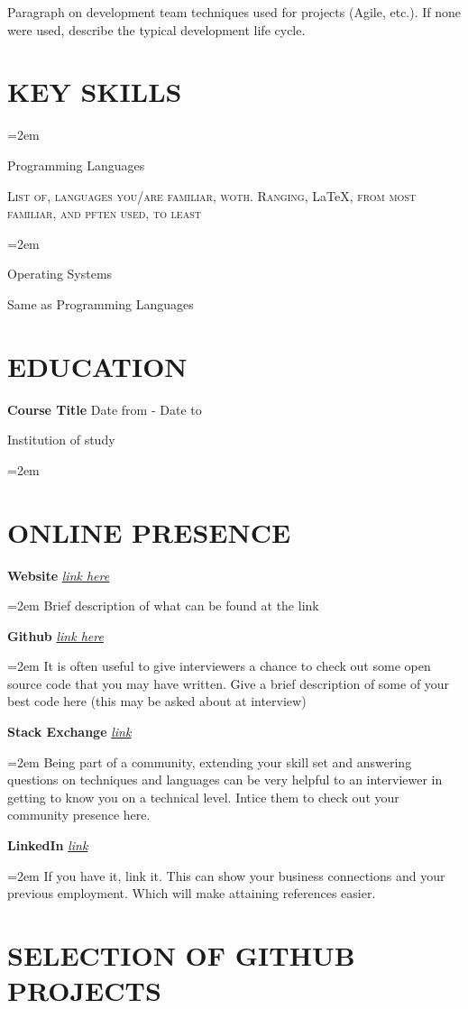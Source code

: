 \documentclass[paper=a4,fontsize=10pt]{scrartcl}	 		%
\newlength{\spacebox}
\newcommand{\sepspace}{\vspace*{1em}}				%
\newcommand{\NewPart}[1]{\section*{\uppercase{#1}}}
\newcommand{\PersonalEntry}[2]{
		\noindent\hangindent=2em\hangafter=0 		%
		\parbox{\spacebox}{					%
		\textit{#1}}							%
		\hspace{1.5em} #2 \par}					%
\newcommand{\SkillsEntry}[2]{						%
		\noindent\hangindent=2em\hangafter=0 		%
		\parbox{\spacebox}{					%
		{#1}}								%
		\hspace{1.5em} #2 \par}					%
\newcommand{\EducationEntry}[5]{
		\noindent \textbf{#1} \hfill				%
		#2 \par							%
		\noindent #3 						%
		\hfill #4 \par							%
		\noindent\hangindent=2em\hangafter=0 \small #5 	%
		\normalsize \par}
\newcommand{\OnlineEntry}[3]{						%
		\noindent \textbf{#1} \hfill 				%
		\noindent \textit{\href{#2}{#2}} \par			%
		\noindent \hangindent=2em \hangafter=0 \small #3	%
		\normalsize \par}
\begin{document}
{{		\par Paragraph on development team techniques used for projects (Agile, etc.). If none were used, describe the typical development life cycle.

\NewPart{Key Skills}
{
	\SkillsEntry{Programming Languages}{\textsc{List of}, \textsc{languages you}/\textsc{are familiar}, \textsc{woth. Ranging}, \LaTeX, \textsc{from most familiar}, \textsc{and pften used}, \textsc{to least}}
	\sepspace
	\SkillsEntry{Operating Systems}{Same as Programming Languages}
}

\NewPart{Education}
{ 
	\EducationEntry{Course Title}{Date from - Date to}{Institution of study}{}
	{
	}
	
}

\NewPart{Online Presence}
{
	\OnlineEntry{Website}{link here}
	{
		Brief description of what can be found at the link
	}
	\sepspace

	\OnlineEntry{Github}{link here}
	{
		It is often useful to give interviewers a chance to check out some open source code that you may have written. Give a brief description of some of your best code here (this may be asked about at interview)
	}
	\sepspace

	\OnlineEntry{Stack Exchange}{link}
	{
		Being part of a community, extending your skill set and answering questions on techniques and languages can be very helpful to an interviewer in getting to know you on a technical level. Intice them to check out your community presence here.
	}
	\sepspace

	\OnlineEntry{LinkedIn}{link}
	{
		If you have it, link it. This can show your business connections and your previous employment. Which will make attaining references easier.
	}
}


\NewPart{Selection of GitHub Projects}
{
	
}}}
\end{document}
